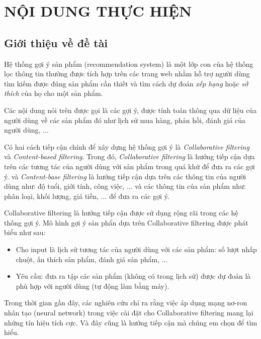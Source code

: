 \documentclass{article}[14pt]
\begin{document}
    \section{NỘI DUNG THỰC HIỆN}
    {

    
    \subsection{Giới thiệu về đề tài}
    
    
    Hệ thống gợi ý sản phẩm (recommendation system) là một lớp con của hệ thống
    lọc thông tin thường được tích hợp trên các trang web nhằm hỗ trợ người dùng
    tìm kiếm được đúng sản phẩm cần thiết  và tìm cách dự đoán 
    \textit{xếp hạng} hoặc \textit{sở thích} của họ cho một sản phẩm.
    
    Các nội dung nói trên được gọi là các gợi ý, được tính toán thông qua dữ liệu
    của người dùng về các sản phẩm đó như lịch sử mua hàng, phản hồi, đánh giá của
    người dùng, ...

    Có hai cách tiếp cận chính để xây dựng hệ thống gợi ý là 
    \textit{Collaborative filtering} và \textit{Content-based filtering}.
    Trong đó, \textit{Collaborative filtering} là hướng tiếp cận dựa trên các 
    tương tác của người dùng với sản phẩm trong quá khứ để đưa ra các gợi ý. 
    và \textit{Content-base filtering} là hướng tiếp cận dựa trên các thông tin 
    của người dùng như: độ tuổi, giới tính, công việc, ... và các thông tin 
    của sản phẩm như: phân loại, khối lượng, giá tiền, ... để đưa ra các gợi ý.

    Collaborative filtering là hướng tiếp cận được sử dụng rộng rãi trong các 
    hệ thống gợi ý. 
    Mô hình gợi ý sản phẩn dựa trên Collaborative filtering được phát biểu như 
    sau:
    \begin{itemize}
        \item Cho input là lịch sử tương tác của người dùng với các sản phẩm:
            số lượt nhấp chuột, ấn thích sản phẩm, đánh giá sản phẩm, ... 
        \item Yêu cầu: đưa ra tập các sản phẩm (không có trong lịch sử) 
        được dự đoán là phù hợp với người dùng (tự động làm bằng máy).
    \end{itemize}
    
    Trong thời gian gần đây, các nghiên cứu chỉ ra rằng việc áp dụng mạng 
    nơ-ron nhân tạo (neural network) trong việc cài đặt cho Collaborative filtering 
    mang lại những tín hiệu tích cực. 
    Và đây cũng là hướng tiếp cận mà chúng em chọn để tìm hiểu.
}
\end{document}
